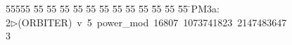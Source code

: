 %
%
\begin{tabbing}
55555 \= 55 \= 55 \= 55 \= 55 \= 55 \= 55 \= 55 \= 55 \= 55 \= 55 \= 55 \= 55 \= \>PM3a:\\[0pt]
2\>$\triangleright$\>(ORBITER)\ v\ 5\ power\_mod\ 16807\ 1073741823\ 2147483647\\[0pt]
3\>\end{tabbing}
